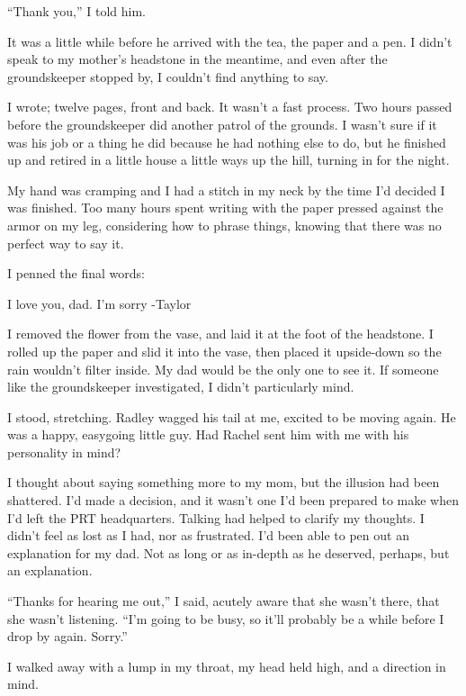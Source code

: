 ``Thank you,'' I told him.



It was a little while before he arrived with the tea, the paper and a pen.  I didn't speak to my mother's headstone in the meantime, and even after the groundskeeper stopped by, I couldn't find anything to say.



I wrote; twelve pages, front and back.  It wasn't a fast process.  Two hours passed before the groundskeeper did another patrol of the grounds.  I wasn't sure if it was his job or a thing he did because he had nothing else to do, but he finished up and retired in a little house a little ways up the hill, turning in for the night.



My hand was cramping and I had a stitch in my neck by the time I'd decided I was finished.  Too many hours spent writing with the paper pressed against the armor on my leg, considering how to phrase things, knowing that there was no perfect way to say it.



I penned the final words:



I love you, dad.  I'm sorry
-Taylor



I removed the flower from the vase, and laid it at the foot of the headstone.  I rolled up the paper and slid it into the vase, then placed it upside-down so the rain wouldn't filter inside.  My dad would be the only one to see it.  If someone like the groundskeeper investigated, I didn't particularly mind.



I stood, stretching.  Radley wagged his tail at me, excited to be moving again.  He was a happy, easygoing little guy.  Had Rachel sent him with me with his personality in mind?



I thought about saying something more to my mom, but the illusion had been shattered.  I'd made a decision, and it wasn't one I'd been prepared to make when I'd left the PRT headquarters.  Talking had helped to clarify my thoughts.  I didn't feel as lost as I had, nor as frustrated.  I'd been able to pen out an explanation for my dad.  Not as long or as in-depth as he deserved, perhaps, but an explanation.



``Thanks for hearing me out,'' I said, acutely aware that she wasn't there, that she wasn't listening.  ``I'm going to be busy, so it'll probably be a while before I drop by again.  Sorry.''



I walked away with a lump in my throat, my head held high, and a direction in mind.





